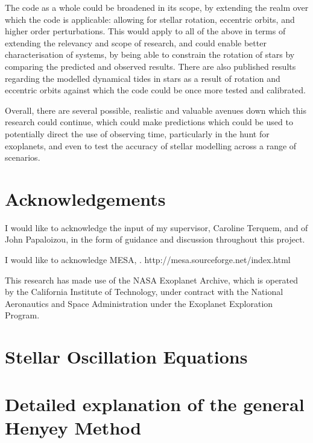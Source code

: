 \documentclass[11pt]{amsart}
\begin{document}
The code as a whole could be broadened in its scope, by extending the realm over which the code is applicable: allowing for stellar rotation, eccentric orbits, and higher order perturbations.  This would apply to all of the above in terms of extending the relevancy and scope of research, and could enable better characterisation of systems, by being able to constrain the rotation of stars by comparing the predicted and observed results.  There are also published results regarding the modelled dynamical tides in stars as a result of rotation and eccentric orbits \cite{Burkart2012} against which the code could be once more tested and calibrated.

Overall, there are several possible, realistic and valuable avenues down which this research could continue, which could make predictions which could be used to potentially direct the use of observing time, particularly in the hunt for exoplanets, and even to test the accuracy of stellar modelling across a range of scenarios.









\section{Acknowledgements}  \label{Acknowledgements}

I would like to acknowledge the input of my supervisor, Caroline Terquem,  and of John Papaloizou, in the form of guidance and discussion throughout this project.

I would like to acknowledge MESA, \cite{Paxton2011}. http://mesa.sourceforge.net/index.html

This research has made use of the NASA Exoplanet Archive, which is operated by the California Institute of Technology, under contract with the National Aeronautics and Space Administration under the Exoplanet Exploration Program.
















\newpage

\appendix

\section{Stellar Oscillation Equations} \label{ap:Osc}


\section{Detailed explanation of the general Henyey Method}   \label{ap:Henyey}
\end{document}
